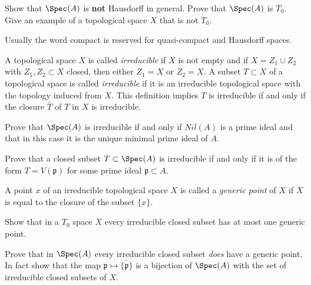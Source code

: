 \begin{exercise}
\label{exercise-not-hausdorff}
Show that $\Spec(A)$ is {\bf not} Hausdorff in general.
Prove that $\Spec(A)$ is $T_0$. Give an example of a topological
space $X$ that is not $T_0$.
\end{exercise}

\begin{remark}
\label{remark-not-hausdorff}
Usually the word compact is reserved for quasi-compact and
Hausdorff spaces.
\end{remark}

\begin{definition}
\label{definition-irreducible}
A topological space $X$ is called {\it irreducible} if $X$ is not empty
and if $X = Z_1\cup Z_2$ with $Z_1, Z_2\subset X$ closed, then either
$Z_1 = X$ or $Z_2 = X$. A subset $T\subset X$ of a topological space
is called {\it irreducible} if it is an irreducible
topological space with the topology induced from $X$.
This definition implies $T$ is irreducible if and only
if the closure $\bar T$ of $T$ in $X$ is irreducible.
\end{definition}

\begin{exercise}
\label{exercise-irreducible-spec}
Prove that $\Spec(A)$ is irreducible if and only if
$Nil(A)$ is a prime ideal and that in this case it is the unique
minimal prime ideal of $A$.
\end{exercise}

\begin{exercise}
\label{exercise-irreducible-prime}
Prove that a closed subset $T\subset \Spec(A)$
is irreducible if and only if it is of the form $T = V({\mathfrak p})$ for
some prime ideal ${\mathfrak p}\subset A$.
\end{exercise}

\begin{definition}
\label{definition-generic-point}
A point $x$ of an irreducible topological space $X$ is called
a {\it generic point} of $X$ if $X$ is equal to the closure of
the subset $\{x\}$.
\end{definition}

\begin{exercise}
\label{exercise-irreducible-T0-at-most-one-generic}
Show that in a $T_0$ space $X$ every irreducible closed
subset has at most one generic point.
\end{exercise}

\begin{exercise}
\label{exercise-spec-sober}
Prove that in $\Spec(A)$ every
irreducible closed subset {\it does} have a generic point.
In fact show that the map
${\mathfrak p} \mapsto \overline{\{{\mathfrak p}\}}$ is
a bijection of $\Spec(A)$ with the set of irreducible closed
subsets of $X$.
\end{exercise}

